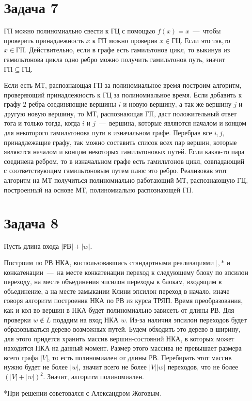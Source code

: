 \documentclass[a4paper,12pt]{article} %
\begin{document}
\section{Задача 7}
\hspace{5mm}
ГП можно полиномиально свести к ГЦ с помощью $f(x)=x$~---~чтобы проверить принадлежность $x$ к ГП можно проверив $x\in ГЦ$. Если это так,то $x\in ГП$. Действительно, если в графе есть гамильтонов цикл, то выкинув из гамильтонова цикла одно ребро можно получить гамильтонов путь, значит $ГП\subseteq ГЦ$.

Если есть МТ, распознающая ГП за полиномиальное время построим алгоритм, проверяющий принадлежность к ГЦ за полиномиальное время. Если добавить к графу $2$ ребра соединяющие вершины $i$ и новую вершину, а так же вершину $j$ и другую новую вершину, то МТ, распознающая ГП, даст положительный ответ тога и только тогда, когда $i$ и $j$~---~вершина, которые являются началом и концом для некоторого гамильтонова пути в изначальном графе. Перебрав все $i,j$, принадлежащие графу, так можно составить список всех пар вершин, которые являются началом и концом некоторых гамильтоновых путей. Если какая-то пара соединена ребром, то в изначальном графе есть гамильтонов цикл, совпадающий с соответствующим гамильтоновым путем плюс это ребро. Реализовав этот алгоритм на МТ получиться полиномиально работающий МТ, распознающую ГЦ, построенный на основе МТ, полиномиально распознающей ГП.


\section{Задача 8}
\hspace{5mm}
Пусть длина входа $|РВ|+|w|$.

Построим по РВ НКА, воспользовавшись стандартными реализациями $|,*$ и конкатенации~---~на месте конкатенации переход к следующему блоку по эпсилон переходу, на месте объединения эпсилон переходы к блокам, входящим в объединение, а на месте замыкании Клини эпсилон переход в начало, иначе говоря алгоритм построения НКА по РВ из курса ТРЯП. Время преобразования, как и кол-во вершин в НКА будет полиномиально зависеть от длины РВ. Для проверки $w\notin L$ подадим на вход НКА $w$. Из-за наличия эпсилон переходов будет образовываться дерево возможных путей. Будем обходить это дерево в ширину, для этого придется хранить массив вершин-состояний НКА, в которых может находится НКА на данный момент. Размер этого массива не превышает размера всего графа $|V|$, то есть полиномиален от длины РВ. Перебирать этот массив нужно будет не более $|w|$, значит всего не более $|V||w|$ переходов, что не более $(|V|+|w|)^2$. Значит, алгоритм полиномиален.

*При решении советовался с Александром Жоговым.
\end{document}
